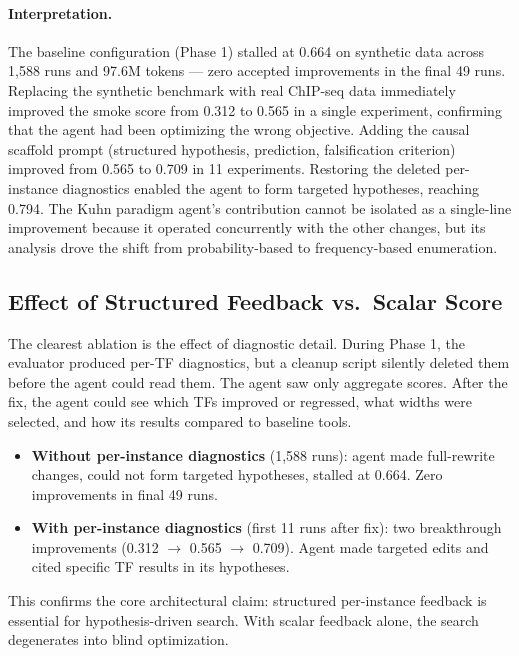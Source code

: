 \documentclass[11pt,a4paper]{article}
\begin{document}
\paragraph{Interpretation.}
The baseline configuration (Phase 1) stalled at 0.664 on synthetic data across 1,588 runs and 97.6M tokens --- zero accepted improvements in the final 49 runs. Replacing the synthetic benchmark with real ChIP-seq data immediately improved the smoke score from 0.312 to 0.565 in a single experiment, confirming that the agent had been optimizing the wrong objective. Adding the causal scaffold prompt (structured hypothesis, prediction, falsification criterion) improved from 0.565 to 0.709 in 11 experiments. Restoring the deleted per-instance diagnostics enabled the agent to form targeted hypotheses, reaching 0.794. The Kuhn paradigm agent's contribution cannot be isolated as a single-line improvement because it operated concurrently with the other changes, but its analysis drove the shift from probability-based to frequency-based enumeration.

\subsection{Effect of Structured Feedback vs.\ Scalar Score}

The clearest ablation is the effect of diagnostic detail. During Phase 1, the evaluator produced per-TF diagnostics, but a cleanup script silently deleted them before the agent could read them. The agent saw only aggregate scores. After the fix, the agent could see which TFs improved or regressed, what widths were selected, and how its results compared to baseline tools.

\begin{itemize}
    \item \textbf{Without per-instance diagnostics} (1,588 runs): agent made full-rewrite changes, could not form targeted hypotheses, stalled at 0.664. Zero improvements in final 49 runs.
    \item \textbf{With per-instance diagnostics} (first 11 runs after fix): two breakthrough improvements (0.312 $\rightarrow$ 0.565 $\rightarrow$ 0.709). Agent made targeted edits and cited specific TF results in its hypotheses.
\end{itemize}

This confirms the core architectural claim: structured per-instance feedback is essential for hypothesis-driven search. With scalar feedback alone, the search degenerates into blind optimization.
\end{document}
